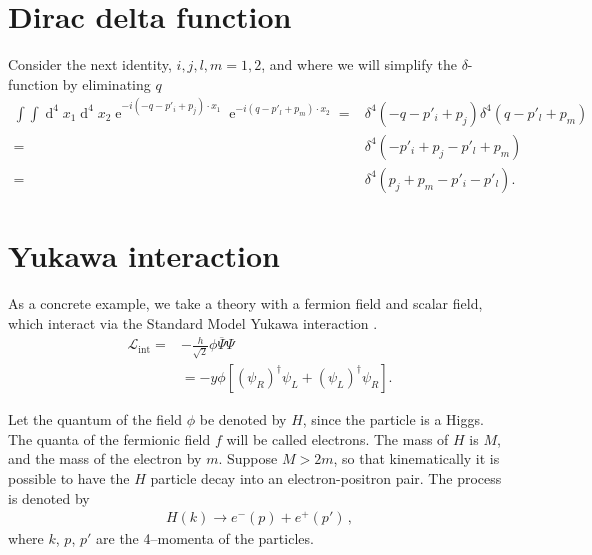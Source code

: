 \section{Dirac delta function}
\begin{frame}
Consider the next identity, $i,j,l,m=1,2$, and where we will simplify the $\delta$-function by eliminating $q$ 
\begin{align}
  \label{eq:deltaidf}
  \int\int \operatorname{d}^4x_1 \operatorname{d}^4x_2
\operatorname{e}^{-i (-q-p'_i+p_j) \cdot x_1}
\operatorname{e}^{-i (q-p'_l+p_m) \cdot x_2}
=&\delta^4 (-q-p'_i+p_j)\delta^4(q-p'_l+p_m) \nonumber\\
  =&\delta^4(-p'_i+p_j-p'_l+p_m) \nonumber\\
  =&\delta^4(p_j+p_m-p'_i-p'_l).
\end{align}
\end{frame}

\section{Yukawa interaction}
\label{sec:feynman-diagrams}

\begin{frame}
As a concrete example, we take a theory with a fermion field and scalar field, which interact via the Standard Model Yukawa interaction \cite{Lahiri:2005sm}. 
\begin{align}
\label{eq:lppp}
  \mathcal{L}_{\text{int}}=&-\frac{h}{\sqrt{2}}\phi\overline{\Psi}\Psi \nonumber\\
&=-y \phi \left[\left( \psi_R \right)^{\dagger}\psi_L+\left(\psi_L \right)^{\dagger}\psi_R  \right].
\end{align}
\end{frame}
Let the quantum of the field $\phi$ be denoted by $H$, since the particle is a Higgs. The quanta of the fermionic field $f$ will be called electrons. The mass of $H$ is $M$, and the mass of the electron by $m$. Suppose $M\gt 2m$,  so that kinematically it is possible to have the $H$ particle decay into an electron-positron pair. The process is denoted by
\begin{align}
  H(k)\to e^-(p)+e^+(p')\,,
\end{align}
where $k$, $p$, $p'$ are the 4--momenta of the particles.

